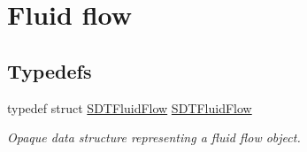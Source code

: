 \hypertarget{group__fluidflow}{}\section{Fluid flow}
\label{group__fluidflow}
\subsection*{Typedefs}
\begin{DoxyCompactItemize}
\item 
\hypertarget{group__fluidflow_ga2df6b1f85ce5d2b1dfb5943ef84cd132}{}typedef struct \hyperlink{group__fluidflow_ga2df6b1f85ce5d2b1dfb5943ef84cd132}{S\+D\+T\+Fluid\+Flow} \hyperlink{group__fluidflow_ga2df6b1f85ce5d2b1dfb5943ef84cd132}{S\+D\+T\+Fluid\+Flow}\label{group__fluidflow_ga2df6b1f85ce5d2b1dfb5943ef84cd132}

\begin{DoxyCompactList}\small\item\em Opaque data structure representing a fluid flow object. \end{DoxyCompactList}\end{DoxyCompactItemize}
